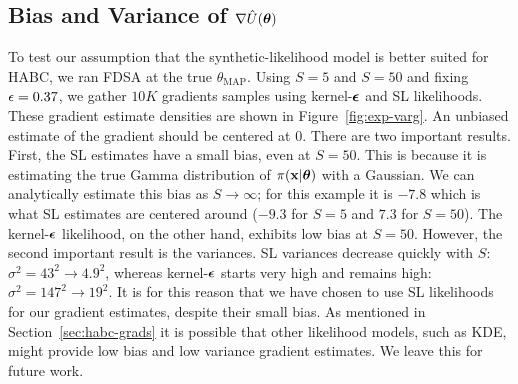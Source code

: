 \documentclass[]{article}
\begin{document}
\subsection{Bias and Variance of $\nabla \hat{U}({\bm \theta})$}
\vspace{-0.1in}
To test our assumption that the synthetic-likelihood model is better suited for HABC, we ran FDSA at the true $\theta_{\text{MAP}}$.  Using $S=5$ and $S=50$ and fixing $\epsilon = 0.37$, we gather $10K$ gradients samples using kernel-${\bm {\epsilon}}$ and SL likelihoods.  These gradient estimate densities are shown in Figure~\ref{fig:exp-varg}.  An unbiased estimate of the gradient should be centered at $0$.  There are two important results.  First, the SL estimates have a small bias, even at $S=50$.  This is because it is estimating the true Gamma distribution of $\pi({\bf x}|{\bm \theta})$ with a Gaussian.  We can analytically estimate this bias as $S \rightarrow \infty$; for this example it is $-7.8$ which is what SL estimates are centered around ($-9.3$ for $S=5$ and $7.3$ for $S=50$).  The kernel-${\bm {\epsilon}}$ likelihood, on the other hand, exhibits low bias at $S=50$.  However, the second important result is the variances.  SL variances decrease quickly with $S$: $\sigma^2 = 43^2 \rightarrow 4.9^2$, whereas kernel-${\bm {\epsilon}}$ starts very high and remains high: $\sigma^2 = 147^2 \rightarrow 19^2$.  It is for this reason that we have chosen to use SL likelihoods for our gradient estimates, despite their small bias. As mentioned in Section~\ref{sec:habc-grads} it is possible that other likelihood models, such as KDE, might provide low bias and low variance gradient estimates.  We leave this for future work.
%
%
\end{document}
